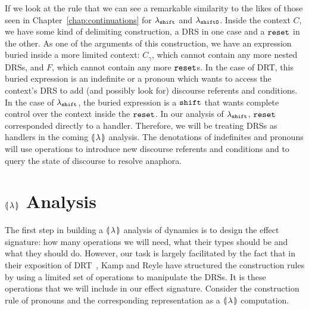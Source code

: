 If we look at the rule that we can see a remarkable similarity to the likes
of those seen in Chapter~\ref{chap:continuations} for $\lambda_{\mathtt{shift}}$ and
$\lambda_{\mathtt{shift0}}$. Inside the context $C$, we have some kind of delimiting
construction, a DRS in one case and a $\mathtt{reset}$ in the other. As one of the
arguments of this construction, we have an expression buried inside a more
limited context: $C_\gamma$, which cannot contain any more nested DRSs, and
$F$, which cannot contain any more $\mathtt{reset}$s. In the case of DRT, this
buried expression is an indefinite or a pronoun which wants to access the
context's DRS to add (and possibly look for) discourse referents and
conditions. In the case of $\lambda_{\mathtt{shift}}$, the buried expression is a
$\mathtt{shift}$ that wants complete control over the context inside the
$\mathtt{reset}$. In our analysis of $\lambda_{\mathtt{shift}}$, $\mathtt{reset}$ corresponded
directly to a handler. Therefore, we will be treating DRSs as handlers in
the coming $\llparenthesis \, \lambda \, \rrparenthesis$ analysis. The denotations of indefinites and
pronouns will use operations to introduce new discourse referents and
conditions and to query the state of discourse to resolve anaphora.


\section{\texorpdfstring{$\llparenthesis \, \lambda \, \rrparenthesis$ Analysis}{Analysis in Our Calculus}}
\label{sec:banana-drt}

The first step in building a $\llparenthesis \, \lambda \, \rrparenthesis$ analysis of dynamics is to
design the effect signature: how many operations we will need, what their
types should be and what they should do. However, our task is largely
facilitated by the fact that in their exposition of
DRT~\cite{kamp1993discourse}, Kamp and Reyle have structured the
construction rules by using a limited set of operations to manipulate the
DRSs. It is these operations that we will include in our effect
signature. Consider the construction rule of pronouns and the corresponding
representation as a $\llparenthesis \, \lambda \, \rrparenthesis$ computation.

\vspace{6mm}

